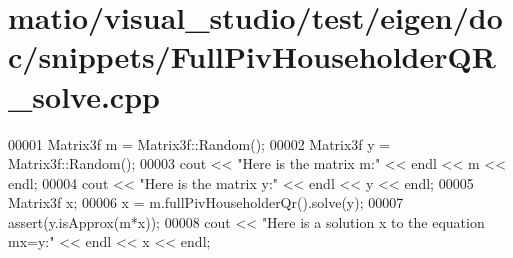 \hypertarget{matio_2visual__studio_2test_2eigen_2doc_2snippets_2_full_piv_householder_q_r__solve_8cpp_source}{}\section{matio/visual\+\_\+studio/test/eigen/doc/snippets/\+Full\+Piv\+Householder\+Q\+R\+\_\+solve.cpp}
\label{matio_2visual__studio_2test_2eigen_2doc_2snippets_2_full_piv_householder_q_r__solve_8cpp_source}

\begin{DoxyCode}
00001 Matrix3f m = Matrix3f::Random();
00002 Matrix3f y = Matrix3f::Random();
00003 cout << \textcolor{stringliteral}{"Here is the matrix m:"} << endl << m << endl;
00004 cout << \textcolor{stringliteral}{"Here is the matrix y:"} << endl << y << endl;
00005 Matrix3f x;
00006 x = m.fullPivHouseholderQr().solve(y);
00007 assert(y.isApprox(m*x));
00008 cout << \textcolor{stringliteral}{"Here is a solution x to the equation mx=y:"} << endl << x << endl;
\end{DoxyCode}
